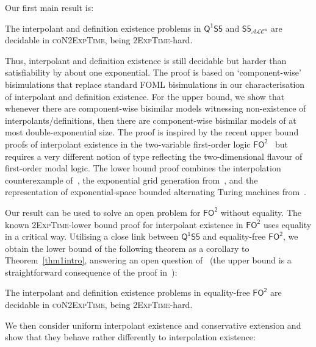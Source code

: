 \documentclass{lmcs} %
\theoremstyle{plain}\newtheorem{satz}[thm]{Satz} %
\newcommand{\nb}[1]{\textcolor{red}{\bf!}%
	\marginpar[\parbox{15mm}{\raggedleft\scriptsize\textcolor{red}{#1}}]%
	{\parbox{15mm}{\raggedright\scriptsize\textcolor{red}{#1}}}}
\newcommand{\FOT}{\ensuremath{\mathsf{FO^2}}}
\newcommand{\FOMS}{\ensuremath{\mathsf{Q^1S5}}}
\newcommand{\ALCS}{\ensuremath{\mathsf{S5}_{\mathcal{ALC}^u}}}
\begin{document}
Our first main result is:

\begin{thm}\label{thm1intro}
The interpolant and definition existence problems in \FOMS{} and \ALCS{} are decidable in \textsc{coN2ExpTime}, being $2$\textsc{ExpTime}-hard.
\end{thm}

Thus, interpolant and definition existence is still decidable but harder than satisfiability by about one exponential. The proof is based on `component-wise' bisimulations that replace standard FOML bisimulations in our characterisation of interpolant and definition existence. For the upper bound, we show that whenever there are component-wise bisimilar models 
witnessing non-existence of interpolants/definitions, then there are component-wise bisimilar models of at most double-exponential size. The proof is inspired by the recent upper bound proofs of interpolant existence in the two-variable first-order logic \FOT{}~\cite{DBLP:conf/lics/JungW21} but requires a very different notion of type reflecting the two-dimensional flavour of first-order modal logic. 
The lower bound proof combines the interpolation counterexample  of~\cite{DBLP:journals/ndjfl/MarxA98}, the exponential grid generation from~\cite{DBLP:conf/time/HodkinsonKKWZ03,DBLP:journals/tocl/GollerJL15}, and the representation of exponential-space bounded alternating Turing machines from~\cite{DBLP:conf/lics/JungW21}. 

Our result can be used to solve an open problem for $\FOT{}$ without equality. The known 2\textsc{ExpTime}-lower bound proof for interpolant existence in $\FOT{}$ uses equality in a critical way. Utilising a close link
between \FOMS{} and equality-free \FOT{}, we obtain the lower bound of the following theorem as a corollary to Theorem~\ref{thm1intro}, answering an open question of~\cite{DBLP:conf/lics/JungW21}
(the upper bound is a straightforward consequence of the proof in~\cite{DBLP:conf/lics/JungW21}):

\begin{thm}\label{thm2intro}
The interpolant and definition existence problems in equality-free \FOT{} 
are decidable in \textsc{coN2\-Exp\-Time}, being $2$\textsc{ExpTime}-hard.
\end{thm}

We then consider uniform interpolant existence and conservative extension and show that they behave rather differently to interpolation existence:
\end{document}
